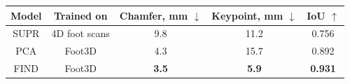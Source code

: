 \begin{table}[h]
	\centering
	\begin{tabular}{ccccc}
		\toprule
		Model & Trained on & Chamfer, mm $\downarrow$ & Keypoint, mm $\downarrow$ & IoU $\uparrow$ \\
		\midrule
		SUPR & 4D foot scans & 9.8 & 11.2 & 0.756 \\
	    PCA & Foot3D & 4.3 & 15.7 & 0.892 \\
		FIND & Foot3D & \textbf{3.5} & \textbf{5.9} & \textbf{0.931}
		\bottomrule
	\end{tabular}
\end{table}

